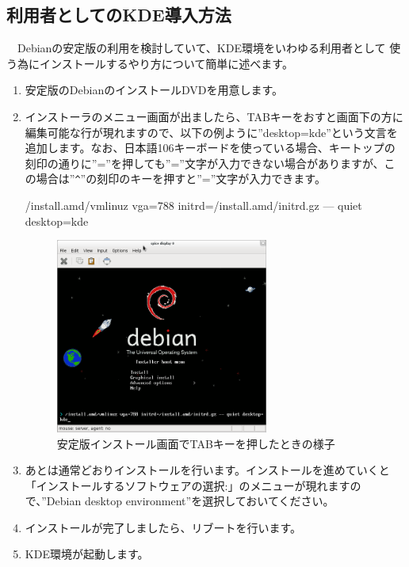 \documentclass[mingoth,a4paper]{jsarticle}
\begin{document}
\subsection{利用者としてのKDE導入方法}

　Debianの安定版の利用を検討していて、KDE環境をいわゆる利用者として
使う為にインストールするやり方について簡単に述べます。

\begin{enumerate}
 \item 安定版のDebianのインストールDVDを用意します。
 \item インストーラのメニュー画面が出ましたら、TABキーをおすと画面下の方に編集可能な行が現れますので、以下の例ように''desktop=kde''という文言を追加します。なお、日本語106キーボードを使っている場合、キートップの刻印の通りに''=''を押しても''=''文字が入力できない場合がありますが、この場合は''\verb|^|''の刻印のキーを押すと''=''文字が入力できます。
\begin{commandline}
 /install.amd/vmlinuz vga=788 initrd=/install.amd/initrd.gz --- quiet desktop=kde
\end{commandline}
\begin{figure}[ht]
\begin{center}
\includegraphics[width=7cm]{image201202/kdedesk/stable-inst-menu.png}
\caption{安定版インストール画面でTABキーを押したときの様子}
\end{center}
\end{figure}
\item あとは通常どおりインストールを行います。インストールを進めていくと「インストールするソフトウェアの選択:」のメニューが現れますので、''Debian desktop environment''を選択しておいてください。
\item インストールが完了しましたら、リブートを行います。
\item KDE環境が起動します。
\end{enumerate}
\end{document}
